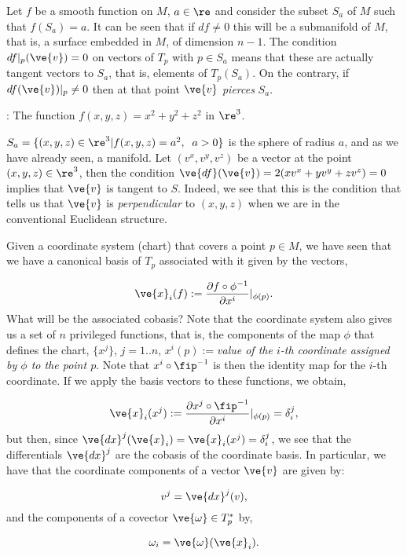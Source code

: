 Let $f$ be a smooth function on $M$, $a\in\re$ and consider the subset 
$S_{a}$ of $M$ such that $f(S_{a})=a$.
It can be seen that if $df\neq0$ this will be a submanifold of $M$, 
that is, a surface embedded in $M$, of dimension $n-1$.
The condition $df|_p(\ve{ v})=0$ on vectors of $T_p$ with $p\in S_{a}$
means that these are actually tangent vectors to $S_{a}$, that is,
elements of $T_p(S_{a})$. On the contrary, if $df(\ve{v})|_p \neq
0$ then at that point $\ve{v}$ {\it pierces} $S_{a}$. 

\ejem: The function $f(x,y,z)=x^2+y^2+z^2$ in $\re^3$. \par
$S_{a}=\{(x,y,z)\in \re^3 | f(x,y,z) = a^2,\;\; a>0\}$ is the sphere of radius
$a$, and as we have already seen, a manifold. Let $(v^{x},v^{y},v^{z})$ be a vector at the point
$(x,y,z)\in\re^{3}$, then the condition $\ve{df}(\ve{v})=2(xv^{x}+yv^{y}+zv^{z})=0$
implies that $\ve{v}$ is tangent to $S$. Indeed, we see that this is the condition that tells us that 
$\ve{v}$ is \textsl{perpendicular} to $(x,y,z)$ when we are in the conventional Euclidean structure.

\espa

Given a coordinate system (chart) that covers a point $p \in M$, we have seen that we have a canonical basis of $T_{p}$ associated with it given by the vectors,

\[
\ve{x}_{i} (f) := \frac{\partial f\circ \phi^{-1}}{\partial x^{i}}|_{\phi(p)}.
\]
%
What will be the associated cobasis? 
Note that the coordinate system also gives us a set of $n$ privileged functions, that is, the components of the map $\phi$ that defines the chart, 
$\{x^{j}\}$, $j=1..n$, 
$x^{i}(p):=$\textsl{value of the $i$-th coordinate assigned by $\phi$ to the point $p$}. 
Note that $x^{i}\circ\fip^{-1}$ is then the identity map for the $i$-th coordinate.
If we apply the basis vectors to these functions, we obtain,

\[
 \ve{x}_{i} (x^{j}) := \frac{\partial x^{j}\circ\fip^{-1}}{\partial x^{i}}|_{\phi(p)} = \delta^{j}_{i},
 \]
 but then, since $\ve{dx}^{j}(\ve{x}_{i})=\ve{x}_{i} (x^{j}) = \delta^{j}_{i}$, we see that the differentials
 $ \ve{dx}^{j}$ are the cobasis of the coordinate basis. 
 In particular, we have that the coordinate components of a vector $\ve{v}$ are given by:
 
 \[
 v^{j} = \ve{dx}^{j}(v),
 \]
%
and the components of a covector $\ve{\omega} \in T_{p}^{*}$ by,

\[
\omega_{i} = \ve{\omega}(\ve{x}_{i}).
\]
 
